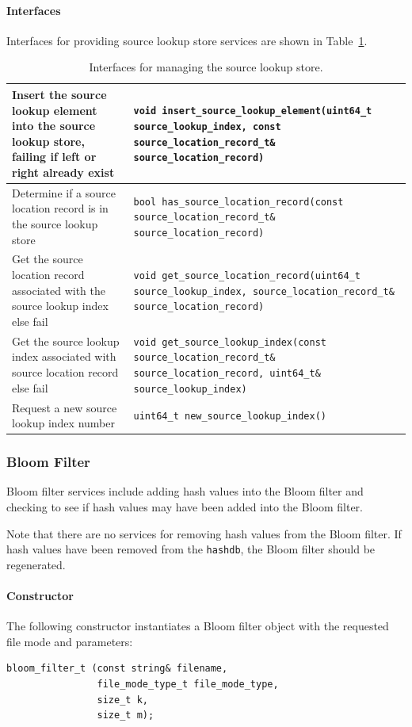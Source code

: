 \documentclass[10pt,twoside]{article}
\newcommand{\hdb}{\texttt{hashdb}\xspace}
\begin{document}
\paragraph{Interfaces}
Interfaces for providing source lookup store services
are shown in Table~\ref{source-lookup-store-interfaces}.
\begin{table}[h]
\center
\begin{tabular}{|p{2in}|p{4in}|}
\hline
Insert the source lookup element into the source lookup store, failing if left or right already exist & \texttt{void insert\_source\_lookup\_element(uint64\_t source\_lookup\_index, const source\_location\_record\_t\& source\_location\_record)} \\
\hline
Determine if a source location record is in the source lookup store & \texttt{bool has\_source\_location\_record(const source\_location\_record\_t\& source\_location\_record)} \\
\hline
Get the source location record associated with the source lookup index else fail & \texttt{void get\_source\_location\_record(uint64\_t source\_lookup\_index, source\_location\_record\_t\& source\_location\_record)} \\
\hline
Get the source lookup index associated with source location record else fail & \texttt{void get\_source\_lookup\_index(const source\_location\_record\_t\& source\_location\_record, uint64\_t\& source\_lookup\_index)} \\
\hline
Request a new source lookup index number & \texttt{uint64\_t new\_source\_lookup\_index()} \\
\hline
\end{tabular}
\caption{Interfaces for managing the source lookup store.\label{source-lookup-store-interfaces}}
\end{table}

\subsubsection{Bloom Filter}
Bloom filter services include adding hash values into the Bloom filter
and checking to see if hash values may have been added into the Bloom filter.

Note that there are no services for removing hash values from the Bloom filter.
If hash values have been removed from the \hdb, the Bloom filter should be regenerated.
\paragraph{Constructor}
The following constructor instantiates a Bloom filter object with the requested file mode and parameters:
\begin{small}
\begin{verbatim}
bloom_filter_t (const string& filename,
                file_mode_type_t file_mode_type,
                size_t k,
                size_t m);
\end{verbatim}
\end{small}
\end{document}
